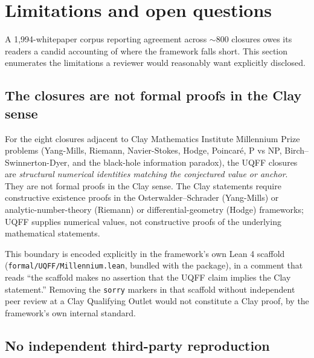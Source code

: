 
\section{Limitations and open questions}
\label{sec:limitations}

A 1{,}994-whitepaper corpus reporting agreement across $\sim 800$
closures owes its readers a candid accounting of where the framework
falls short. This section enumerates the limitations a reviewer would
reasonably want explicitly disclosed.

\subsection{The closures are not formal proofs in the Clay sense}
\label{sec:lim_clay}

For the eight closures adjacent to Clay Mathematics Institute
Millennium Prize problems (Yang-Mills, Riemann, Navier-Stokes,
Hodge, Poincar\'e, P vs NP, Birch--Swinnerton-Dyer, and the
black-hole information paradox), the UQFF closures are
\emph{structural numerical identities matching the conjectured
value or anchor}. They are not formal proofs in the Clay sense.
The Clay statements require constructive existence proofs in the
Osterwalder--Schrader (Yang-Mills) or analytic-number-theory
(Riemann) or differential-geometry (Hodge) frameworks; UQFF
supplies numerical values, not constructive proofs of the
underlying mathematical statements.

This boundary is encoded explicitly in the framework's own Lean 4
scaffold (\texttt{formal/UQFF/Millennium.lean}, bundled with the
package), in a comment that reads ``the scaffold makes no assertion
that the UQFF claim implies the Clay statement.'' Removing the
\texttt{sorry} markers in that scaffold without independent peer
review at a Clay Qualifying Outlet would not constitute a Clay
proof, by the framework's own internal standard.

\subsection{No independent third-party reproduction}
\label{sec:lim_reproduction}

